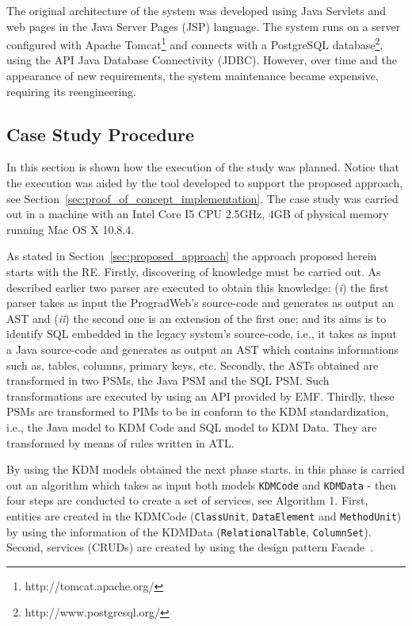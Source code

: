 \documentclass[a4paper,twoside]{article}
\begin{document}
The original architecture of the system was developed using Java Servlets and web pages in the Java Server Pages (JSP) language. The system runs on a server configured with Apache Tomcat\footnote{http://tomcat.apache.org/} and connects with a PostgreSQL database\footnote{http://www.postgresql.org/}, using the API Java Database Connectivity (JDBC). However, over time and the appearance of new requirements, the system maintenance became expensive, requiring its reengineering.

\subsection{Case Study Procedure} %
\label{sub:case_study_procedure}

In this section is shown how the execution of the study was planned. Notice that the execution was aided by the tool developed to support the proposed approach, see Section~\ref{sec:proof_of_concept_implementation}. The case study was carried out in a machine with an Intel Core I5 CPU 2.5GHz, 4GB of physical memory running Mac OS X 10.8.4. 

As stated in Section~\ref{sec:proposed_approach} the approach proposed herein starts with the RE. Firstly, discovering of knowledge must be carried out. As described earlier two parser are executed to obtain this knowledge: (\textit{i}) the first parser takes as input the ProgradWeb's source-code and generates as output an AST and (\textit{ii}) the second one is an extension of the first one; and its aims is to identify SQL embedded in the legacy system's source-code, i.e., it takes as input a Java source-code and generates as output an AST which contains informations such as, tables, columns, primary keys, etc. Secondly, the ASTs obtained are transformed in two PSMs, the Java PSM and the SQL PSM. Such transformations are executed by using an API provided by EMF. Thirdly, these PSMs are transformed to PIMs to be in conform to the KDM standardization, i.e., the Java model to KDM Code and SQL model to KDM Data. They are transformed by means of rules written in ATL. 


By using the KDM models obtained the next phase starts. in this phase is carried out an algorithm which takes as input both models \texttt{KDMCode} and \texttt{KDMData} - then four steps are conducted to create a set of services, see Algorithm 1. First, entities are created in the KDMCode (\texttt{ClassUnit}, \texttt{DataElement} and \texttt{MethodUnit}) by using the information of the KDMData (\texttt{RelationalTable}, \texttt{ColumnSet}). Second, services (CRUDs) are created by using the design pattern Facade~\cite{Gamma1994}.
\end{document}
